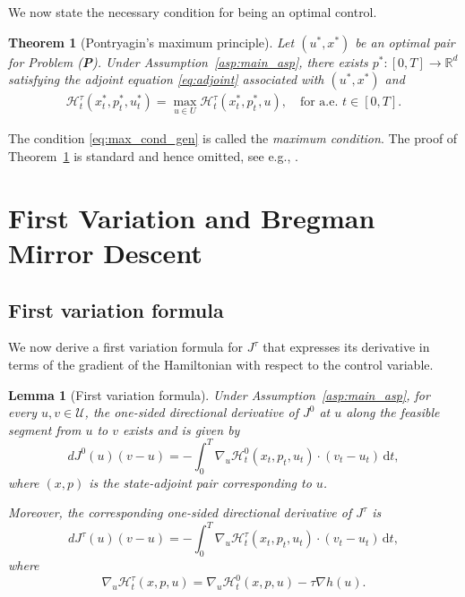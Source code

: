 \documentclass[11pt]{amsart}
\theoremstyle{plain}
\newtheorem{theorem}{Theorem}
\newtheorem{lemma}{Lemma}
\theoremstyle{definition}
\theoremstyle{remark}
\newcommand{\dd}{\,\mathrm{d}}
\begin{document}
We now state the necessary condition for being an optimal control.

\begin{theorem}[Pontryagin's maximum principle] \label{thm:cont_max_prin}
    Let $(u^*,x^*)$ be an optimal pair for Problem (\textbf{P}). Under Assumption~\ref{asp:main_asp}, there exists $p^*: [0,T] \to \mathbb{R}^d$ satisfying the adjoint equation \eqref{eq:adjoint} associated with $(u^*, x^*)$ and
    \begin{align} \label{eq:max_cond_gen}
                  \mathcal{H}_t^\tau(x^*_t, p^*_t, u^*_t) = \max_{u \in U} \mathcal{H}_t^\tau(x^*_t, p^*_t, u), \quad \text{for a.e. } t \in [0,T].
    \end{align}
\end{theorem}

The condition \eqref{eq:max_cond_gen} is called the \textit{maximum condition}. The proof of Theorem~\ref{thm:cont_max_prin} is standard and hence omitted, see e.g., \cite[Chapter 3]{yong1999stochastic}.

\section{First Variation and Bregman Mirror Descent}\label{sec:first_var}

\subsection{First variation formula}

We now derive a first variation formula for $J^{\tau}$ that expresses its derivative in terms of the gradient of the Hamiltonian with respect to the control variable.

\begin{lemma}[First variation formula]\label{lem:first-variation}
Under Assumption~\ref{asp:main_asp}, for every $u,v\in\mathcal U$,
the one-sided directional derivative of $J^0$ at $u$ along the feasible segment from $u$ to $v$ exists and is given by
\begin{equation}\label{eq:first-var-J0}
dJ^0(u)(v-u)
=
-\int_0^T \nabla_u \mathcal H_t^0(x_t,p_t,u_t)\cdot (v_t-u_t)\dd t,
\end{equation}
where $(x, p)$ is the state-adjoint pair corresponding to $u$.

Moreover, the corresponding one-sided directional derivative of $J^\tau$ is
\begin{equation}\label{eq:first-var-Jtau}
dJ^\tau(u)(v-u)
=
- \int_0^T \nabla_u \mathcal H_t^\tau(x_t,p_t,u_t)\cdot (v_t-u_t)\dd t,
\end{equation}
where
\[
\nabla_u \mathcal H_t^\tau(x,p,u)
=
\nabla_u \mathcal H_t^0(x,p,u) - \tau \nabla h(u).
\]
\end{lemma}
\end{document}

